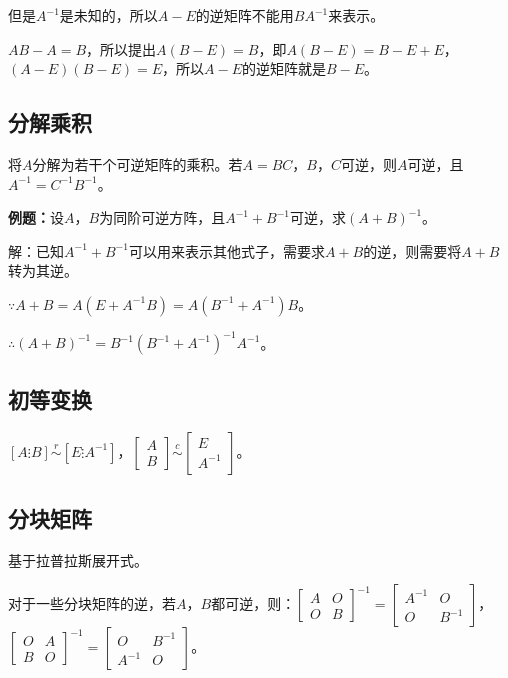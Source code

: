 \documentclass[UTF8, 12pt]{ctexart}
\begin{document}
但是$A^{-1}$是未知的，所以$A-E$的逆矩阵不能用$BA^{-1}$来表示。

$AB-A=B$，所以提出$A(B-E)=B$，即$A(B-E)=B-E+E$，$(A-E)(B-E)=E$，所以$A-E$的逆矩阵就是$B-E$。

\subsection{分解乘积}

将$A$分解为若干个可逆矩阵的乘积。若$A=BC$，$B$，$C$可逆，则$A$可逆，且$A^{-1}=C^{-1}B^{-1}$。

\textbf{例题：}设$A$，$B$为同阶可逆方阵，且$A^{-1}+B^{-1}$可逆，求$(A+B)^{-1}$。

解：已知$A^{-1}+B^{-1}$可以用来表示其他式子，需要求$A+B$的逆，则需要将$A+B$转为其逆。

$\because A+B=A(E+A^{-1}B)=A(B^{-1}+A^{-1})B$。

$\therefore (A+B)^{-1}=B^{-1}(B^{-1}+A^{-1})^{-1}A^{-1}$。

\subsection{初等变换}

$\left[A\vdots B\right]\overset{r}{\sim}\left[E\vdots A^{-1}\right]$，$\left[\begin{array}{c}
    A \\
    B
\end{array}\right]\overset{c}{\sim}\left[\begin{array}{c}
    E \\
    A^{-1}
\end{array}\right]$。

\subsection{分块矩阵}

基于拉普拉斯展开式。

对于一些分块矩阵的逆，若$A$，$B$都可逆，则：$\left[\begin{array}{cc}
    A & O \\
    O & B
\end{array}\right]^{-1}=\left[\begin{array}{cc}
    A^{-1} & O \\
    O & B^{-1}
\end{array}\right]$，$\left[\begin{array}{cc}
    O & A \\
    B & O
\end{array}\right]^{-1}=\left[\begin{array}{cc}
    O & B^{-1} \\
    A^{-1} & O
\end{array}\right]$。\medskip
\end{document}
